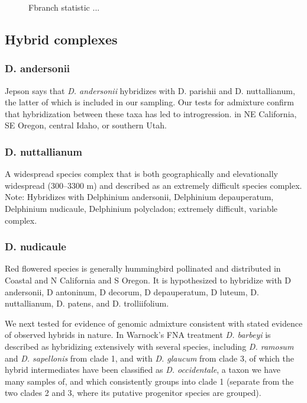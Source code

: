 \documentclass[11pt]{article}
\begin{document}
\begin{figure}[t]
	\centering
	\caption{
        Fbranch statistic ...
	}
	\label{fig:fbranch}
\end{figure}


\subsection{Hybrid complexes}

\subsubsection{D. andersonii}
Jepson says that \emph{D. andersonii} hybridizes with D. parishii and D. nuttallianum,
the latter of which is included in our sampling. Our tests for admixture confirm
that hybridization between these taxa has led to introgression.
in NE California, SE Oregon, central Idaho, or southern Utah. 


\subsubsection{D. nuttallianum}
A widespread species complex that is both geographically and elevationally widespread (300--3300 m) and 
described as an extremely difficult species complex. 
Note: Hybridizes with Delphinium andersonii, Delphinium depauperatum, Delphinium nudicaule, Delphinium polycladon; extremely difficult, variable complex.


\subsubsection{D. nudicaule}
Red flowered species is generally hummingbird pollinated and distributed in Coastal and N California and S Oregon. It is hypothesized to hybridize with D andersonii, D antoninum, D decorum, D depauperatum, D luteum, D. nuttallianum, D. patens, and D. trolliifolium. 


We next tested for evidence of genomic admixture consistent with stated evidence
of observed hybrids in nature. In Warnock's FNA treatment \emph{D. barbeyi} is 
described as hybridizing extensively with several species, including 
\emph{D. ramosum} and \emph{D. sapellonis} from clade 1, and with 
\emph{D. glaucum} from clade 3, of which the hybrid intermediates have been 
classified as \emph{D. occidentale}, a taxon we have many samples of, and
which consistently groups into clade 1 (separate from the two clades 2 and 3, 
where its putative progenitor species are grouped). 
\end{document}
